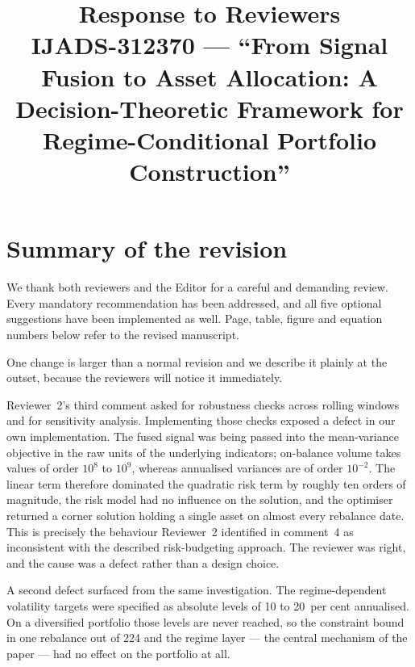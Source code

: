 \documentclass[11pt,a4paper]{article}
\title{\vspace{-2.2cm}Response to Reviewers\\[4pt]
\large IJADS-312370 --- ``From Signal Fusion to Asset Allocation: A Decision-Theoretic
Framework for Regime-Conditional Portfolio Construction''}
\author{}
\date{}
\begin{document}
\maketitle
\vspace{-2.2cm}

\section*{Summary of the revision}

We thank both reviewers and the Editor for a careful and demanding review. Every
mandatory recommendation has been addressed, and all five optional suggestions have been
implemented as well. Page, table, figure and equation numbers below refer to the revised
manuscript.

One change is larger than a normal revision and we describe it plainly at the outset,
because the reviewers will notice it immediately.

Reviewer~2's third comment asked for robustness checks across rolling windows and for
sensitivity analysis. Implementing those checks exposed a defect in our own
implementation. The fused signal was being passed into the mean-variance objective in
the raw units of the underlying indicators; on-balance volume takes values of order
$10^{8}$ to $10^{9}$, whereas annualised variances are of order $10^{-2}$. The linear
term therefore dominated the quadratic risk term by roughly ten orders of magnitude, the
risk model had no influence on the solution, and the optimiser returned a corner
solution holding a single asset on almost every rebalance date. This is precisely the
behaviour Reviewer~2 identified in comment~4 as inconsistent with the described
risk-budgeting approach. The reviewer was right, and the cause was a defect rather than
a design choice.

A second defect surfaced from the same investigation. The regime-dependent volatility
targets were specified as absolute levels of 10 to 20~per cent annualised. On a
diversified portfolio those levels are never reached, so the constraint bound in one
rebalance out of 224 and the regime layer --- the central mechanism of the paper --- had
no effect on the portfolio at all.
\end{document}
